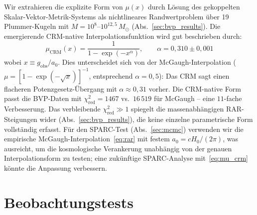 \documentclass[aps,prd,twocolumn,superscriptaddress,nofootinbib]{revtex4-2}
\begin{document}
Wir extrahieren die explizite Form von $\mu(x)$ durch L\"osung des gekoppelten Skalar-Vektor-Metrik-Systems als nichtlineares Randwertproblem \"uber 19 Plummer-Kugeln mit $M = 10^{8}$--$10^{12{,}5}\,M_\odot$ (Abs.~\ref{sec:bvp_results}). Die emergierende CRM-native Interpolationsfunktion wird gut beschrieben durch:
\begin{equation}
\mu_{\mathrm{CRM}}(x) = \frac{1}{1 - \exp(-x^\alpha)}, \qquad \alpha = 0{,}310 \pm 0{,}001
\label{eq:mu_crm}
\end{equation}
wobei $x \equiv g_{\mathrm{obs}}/a_0$. Dies unterscheidet sich von der McGaugh-Interpolation ($\mu = [1 - \exp(-\sqrt{x})]^{-1}$, entsprechend $\alpha = 0{,}5$): Das CRM sagt einen flacheren Potenzgesetz-\"Ubergang mit $\alpha \approx 0{,}31$ vorher. Die CRM-native Form passt die BVP-Daten mit $\chi^2_{\mathrm{red}} = 1467$ vs.\ $16\,519$ f\"ur McGaugh -- eine $11$-fache Verbesserung. Das verbleibende $\chi^2_{\mathrm{red}} \gg 1$ spiegelt die massenabh\"angigen RAR-Steigungen wider (Abs.~\ref{sec:bvp_results}), die keine einzelne parametrische Form vollst\"andig erfasst. F\"ur den SPARC-Test (Abs.~\ref{sec:mcmc}) verwenden wir die empirische McGaugh-Interpolation~\eqref{eq:rar} mit festem $a_0 = cH_0/(2\pi)$, was ausreicht, um die kosmologische Verankerung unabh\"angig von der genauen Interpolationsform zu testen; eine zuk\"unftige SPARC-Analyse mit~\eqref{eq:mu_crm} k\"onnte die Anpassung verbessern.


\section{Beobachtungstests}
\label{sec:tests}
\end{document}
